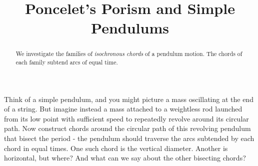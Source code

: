\documentclass{ximera}
\title{Poncelet's Porism and Simple Pendulums}
\begin{document}
\begin{abstract}
We investigate the families of \emph{isochronous chords} of a pendulum motion. The chords of each family subtend arcs of equal time.
\end{abstract}
\maketitle



Think of a simple pendulum, and you might picture a mass oscillating at the end of a string. But imagine instead a mass attached to a weightless rod launched from its low point with sufficient speed to repeatedly revolve around its circular path. Now construct chords around the circular path of this revolving pendulum that bisect the period - the pendulum should traverse the arcs subtended by each chord in equal times. One such chord is the vertical diameter. Another is horizontal, but where? And what can we say about the other bisecting chords?



\end{document}
